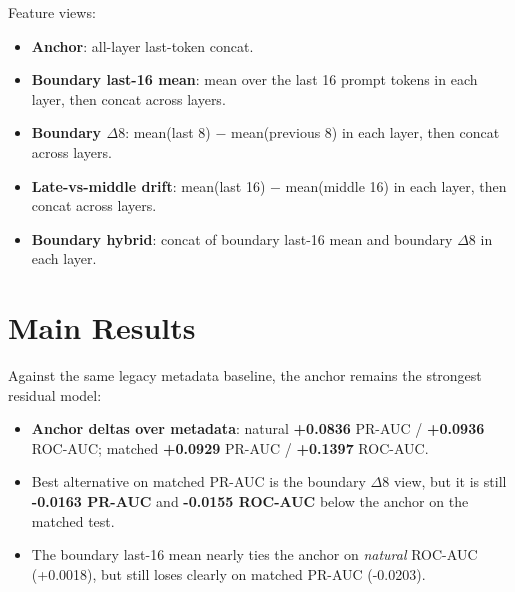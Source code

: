 \documentclass[11pt]{article}
\begin{document}
Feature views:
\begin{itemize}
  \item \textbf{Anchor}: all-layer last-token concat.
  \item \textbf{Boundary last-16 mean}: mean over the last 16 prompt tokens in each layer, then concat across layers.
  \item \textbf{Boundary $\Delta8$}: mean(last 8) $-$ mean(previous 8) in each layer, then concat across layers.
  \item \textbf{Late-vs-middle drift}: mean(last 16) $-$ mean(middle 16) in each layer, then concat across layers.
  \item \textbf{Boundary hybrid}: concat of boundary last-16 mean and boundary $\Delta8$ in each layer.
\end{itemize}

\section*{Main Results}
\begin{center}
\small
\setlength{\tabcolsep}{4pt}
\end{center}

Against the same legacy metadata baseline, the anchor remains the strongest residual model:
\begin{itemize}
  \item \textbf{Anchor deltas over metadata}: natural \textbf{+0.0836} PR-AUC / \textbf{+0.0936} ROC-AUC; matched \textbf{+0.0929} PR-AUC / \textbf{+0.1397} ROC-AUC.
  \item Best alternative on matched PR-AUC is the boundary $\Delta8$ view, but it is still \textbf{-0.0163 PR-AUC} and \textbf{-0.0155 ROC-AUC} below the anchor on the matched test.
  \item The boundary last-16 mean nearly ties the anchor on \emph{natural} ROC-AUC (+0.0018), but still loses clearly on matched PR-AUC (-0.0203).
\end{itemize}
\end{document}
